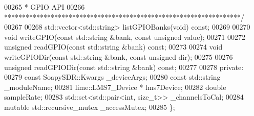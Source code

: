\begin{DoxyCode}
00265 \textcolor{comment}{     * GPIO API}
00266 \textcolor{comment}{     ******************************************************************/}
00267 
00268     std::vector<std::string> listGPIOBanks(\textcolor{keywordtype}{void}) \textcolor{keyword}{const};
00269 
00270     \textcolor{keywordtype}{void} writeGPIO(\textcolor{keyword}{const} std::string &bank, \textcolor{keyword}{const} \textcolor{keywordtype}{unsigned} value);
00271 
00272     \textcolor{keywordtype}{unsigned} readGPIO(\textcolor{keyword}{const} std::string &bank) \textcolor{keyword}{const};
00273 
00274     \textcolor{keywordtype}{void} writeGPIODir(\textcolor{keyword}{const} std::string &bank, \textcolor{keyword}{const} \textcolor{keywordtype}{unsigned} dir);
00275 
00276     \textcolor{keywordtype}{unsigned} readGPIODir(\textcolor{keyword}{const} std::string &bank) \textcolor{keyword}{const};
00277 
00278 \textcolor{keyword}{private}:
00279     \textcolor{keyword}{const} SoapySDR::Kwargs _deviceArgs; 
00280     \textcolor{keyword}{const} std::string _moduleName;
00281     lime::LMS7_Device * lms7Device;
00282     \textcolor{keywordtype}{double} sampleRate;
00283     std::set<std::pair<int, size\_t>> _channelsToCal;
00284     \textcolor{keyword}{mutable} std::recursive\_mutex _accessMutex;
00285 \};
\end{DoxyCode}
